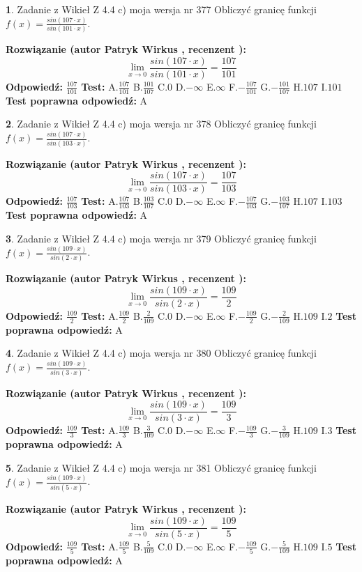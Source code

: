 \documentclass[12pt, a4paper]{article}
\theoremstyle{definition} %
\newtheorem{zad}{}
\newcommand{\zadStart}[1]{\begin{zad}#1\newline}
\newcommand{\zadStop}{\end{zad}}
\newcommand{\rozwStart}[2]{\noindent \textbf{Rozwiązanie (autor #1 , recenzent #2): }\newline}
\newcommand{\rozwStop}{\newline}
\newcommand{\odpStart}{\noindent \textbf{Odpowiedź:}\newline}
\newcommand{\odpStop}{\newline}
\newcommand{\testStart}{\noindent \textbf{Test:}\newline}
\newcommand{\testStop}{\newline}
\newcommand{\kluczStart}{\noindent \textbf{Test poprawna odpowiedź:}\newline}
\newcommand{\kluczStop}{\newline}
\begin{document}
\zadStart{Zadanie z Wikieł Z 4.4 c) moja wersja nr 377}
Obliczyć granicę funkcji $f(x)=\frac{sin(107\cdot x)}{sin(101\cdot x)}$.
\zadStop
\rozwStart{Patryk Wirkus}{}
$$\lim\limits_{x\to 0}\frac{sin(107\cdot x)}{sin(101\cdot x)}=
\frac{107}{101}$$
\rozwStop
\odpStart
$\frac{107}{101}$
\odpStop
\testStart
A.$\frac{107}{101}$
B.$\frac{101}{107}$
C.$0$
D.$-\infty$
E.$\infty$
F.$-\frac{107}{101}$
G.$-\frac{101}{107}$
H.$107$
I.$101$
\testStop
\kluczStart
A
\kluczStop



\zadStart{Zadanie z Wikieł Z 4.4 c) moja wersja nr 378}
Obliczyć granicę funkcji $f(x)=\frac{sin(107\cdot x)}{sin(103\cdot x)}$.
\zadStop
\rozwStart{Patryk Wirkus}{}
$$\lim\limits_{x\to 0}\frac{sin(107\cdot x)}{sin(103\cdot x)}=
\frac{107}{103}$$
\rozwStop
\odpStart
$\frac{107}{103}$
\odpStop
\testStart
A.$\frac{107}{103}$
B.$\frac{103}{107}$
C.$0$
D.$-\infty$
E.$\infty$
F.$-\frac{107}{103}$
G.$-\frac{103}{107}$
H.$107$
I.$103$
\testStop
\kluczStart
A
\kluczStop



\zadStart{Zadanie z Wikieł Z 4.4 c) moja wersja nr 379}
Obliczyć granicę funkcji $f(x)=\frac{sin(109\cdot x)}{sin(2\cdot x)}$.
\zadStop
\rozwStart{Patryk Wirkus}{}
$$\lim\limits_{x\to 0}\frac{sin(109\cdot x)}{sin(2\cdot x)}=
\frac{109}{2}$$
\rozwStop
\odpStart
$\frac{109}{2}$
\odpStop
\testStart
A.$\frac{109}{2}$
B.$\frac{2}{109}$
C.$0$
D.$-\infty$
E.$\infty$
F.$-\frac{109}{2}$
G.$-\frac{2}{109}$
H.$109$
I.$2$
\testStop
\kluczStart
A
\kluczStop



\zadStart{Zadanie z Wikieł Z 4.4 c) moja wersja nr 380}
Obliczyć granicę funkcji $f(x)=\frac{sin(109\cdot x)}{sin(3\cdot x)}$.
\zadStop
\rozwStart{Patryk Wirkus}{}
$$\lim\limits_{x\to 0}\frac{sin(109\cdot x)}{sin(3\cdot x)}=
\frac{109}{3}$$
\rozwStop
\odpStart
$\frac{109}{3}$
\odpStop
\testStart
A.$\frac{109}{3}$
B.$\frac{3}{109}$
C.$0$
D.$-\infty$
E.$\infty$
F.$-\frac{109}{3}$
G.$-\frac{3}{109}$
H.$109$
I.$3$
\testStop
\kluczStart
A
\kluczStop



\zadStart{Zadanie z Wikieł Z 4.4 c) moja wersja nr 381}
Obliczyć granicę funkcji $f(x)=\frac{sin(109\cdot x)}{sin(5\cdot x)}$.
\zadStop
\rozwStart{Patryk Wirkus}{}
$$\lim\limits_{x\to 0}\frac{sin(109\cdot x)}{sin(5\cdot x)}=
\frac{109}{5}$$
\rozwStop
\odpStart
$\frac{109}{5}$
\odpStop
\testStart
A.$\frac{109}{5}$
B.$\frac{5}{109}$
C.$0$
D.$-\infty$
E.$\infty$
F.$-\frac{109}{5}$
G.$-\frac{5}{109}$
H.$109$
I.$5$
\testStop
\kluczStart
A
\kluczStop
\end{document}
